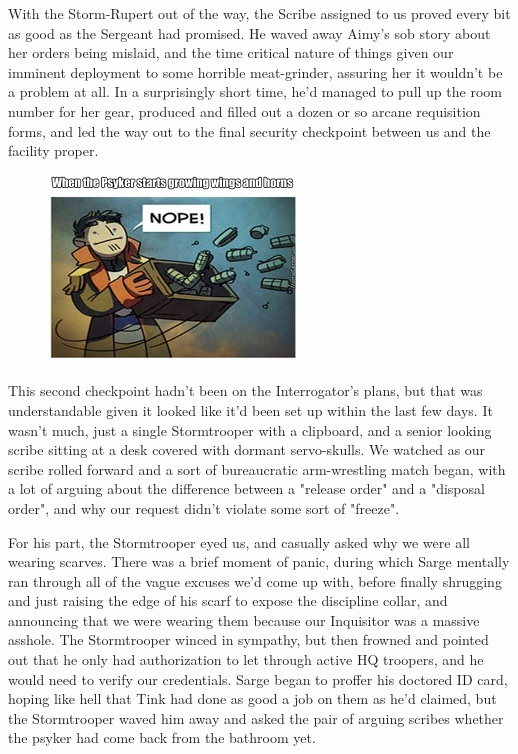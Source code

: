 With the Storm-Rupert out of the way, the Scribe assigned to us proved every bit as good as the Sergeant had promised. 
He waved away Aimy's sob story about her orders being mislaid, and the time critical nature of things given our imminent deployment to some horrible meat-grinder, assuring her it wouldn't be a problem at all. 
In a surprisingly short time, he'd managed to pull up the room number for her gear, produced and filled out a dozen or so arcane requisition forms, and led the way out to the final security checkpoint between us and the facility proper.

\begin{figure}
	\begin{center}
		\includegraphics[width=\figwidth]{pics/21/71.png}
	\end{center}
\end{figure}
This second checkpoint hadn't been on the Interrogator's plans, but that was understandable given it looked like it'd been set up within the last few days. 
It wasn't much, just a single Stormtrooper with a clipboard, and a senior looking scribe sitting at a desk covered with dormant servo-skulls. 
We watched as our scribe rolled forward and a sort of bureaucratic arm-wrestling match began, with a lot of arguing about the difference between a "release order" and a "disposal order", and why our request didn't violate some sort of "freeze". 


For his part, the Stormtrooper eyed us, and casually asked why we were all wearing scarves. 
There was a brief moment of panic, during which Sarge mentally ran through all of the vague excuses we'd come up with, before finally shrugging and just raising the edge of his scarf to expose the discipline collar, and announcing that we were wearing them because our Inquisitor was a massive asshole. 
The Stormtrooper winced in sympathy, but then frowned and pointed out that he only had authorization to let through active HQ troopers, and he would need to verify our credentials. 
Sarge began to proffer his doctored ID card, hoping like hell that Tink had done as good a job on them as he'd claimed, but the Stormtrooper waved him away and asked the pair of arguing scribes whether the psyker had come back from the bathroom yet.

